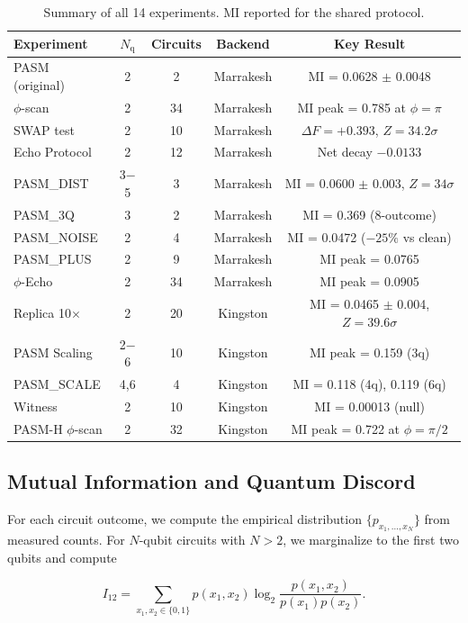 \documentclass[12pt,a4paper]{article}
\begin{document}
\begin{table}[ht]
\centering
\caption{Summary of all 14 experiments. MI reported for the shared protocol.}
\label{tab:experiments}
\small
\begin{tabular}{lcccc}
\toprule
Experiment & $N_{\text{q}}$ & Circuits & Backend & Key Result \\
\midrule
PASM (original) & 2 & 2 & Marrakesh & MI = 0.0628 $\pm$ 0.0048 \\
$\phi$-scan & 2 & 34 & Marrakesh & MI peak = 0.785 at $\phi = \pi$ \\
SWAP test & 2 & 10 & Marrakesh & $\Delta F = +0.393$, $Z = 34.2\sigma$ \\
Echo Protocol & 2 & 12 & Marrakesh & Net decay $-0.0133$ \\
PASM\_DIST & 3$-$5 & 3 & Marrakesh & MI = 0.0600 $\pm$ 0.003, $Z = 34\sigma$ \\
PASM\_3Q & 3 & 2 & Marrakesh & MI = 0.369 (8-outcome) \\
PASM\_NOISE & 2 & 4 & Marrakesh & MI = 0.0472 ($-25\%$ vs clean) \\
PASM\_PLUS & 2 & 9 & Marrakesh & MI peak = 0.0765 \\
$\phi$-Echo & 2 & 34 & Marrakesh & MI peak = 0.0905 \\
Replica 10$\times$ & 2 & 20 & Kingston & MI = 0.0465 $\pm$ 0.004, $Z = 39.6\sigma$ \\
PASM Scaling & 2$-$6 & 10 & Kingston & MI peak = 0.159 (3q) \\
PASM\_SCALE & 4,6 & 4 & Kingston & MI = 0.118 (4q), 0.119 (6q) \\
Witness & 2 & 10 & Kingston & MI = 0.00013 (null) \\
PASM-H $\phi$-scan & 2 & 32 & Kingston & MI peak = 0.722 at $\phi = \pi/2$ \\
\bottomrule
\end{tabular}
\end{table}

\subsection{Mutual Information and Quantum Discord}

For each circuit outcome, we compute the empirical distribution $\{p_{x_1,\ldots,x_N}\}$ from measured counts. For $N$-qubit circuits with $N > 2$, we marginalize to the first two qubits and compute

\begin{equation}
I_{12} = \sum_{x_1,x_2 \in \{0,1\}} p(x_1,x_2) \log_2 \frac{p(x_1,x_2)}{p(x_1)p(x_2)}.
\label{eq:MI}
\end{equation}
\end{document}
